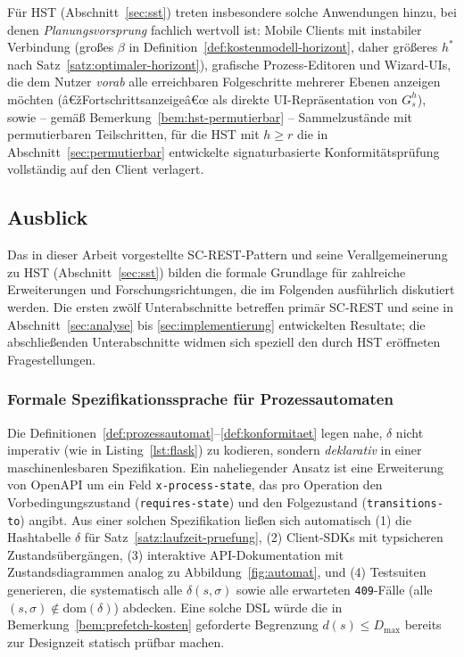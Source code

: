 ﻿\documentclass[a4paper,12pt]{article}
\theoremstyle{definition}
\begin{document}
Für HST (Abschnitt~\ref{sec:sst}) treten insbesondere solche Anwendungen hinzu, bei denen
\emph{Planungsvorsprung} fachlich wertvoll ist: Mobile Clients mit instabiler Verbindung
(großes $\beta$ in Definition~\ref{def:kostenmodell-horizont}, daher größeres $h^\ast$
nach Satz~\ref{satz:optimaler-horizont}), grafische Prozess-Editoren und Wizard-UIs, die
dem Nutzer \emph{vorab} alle erreichbaren Folgeschritte mehrerer Ebenen anzeigen möchten
(â€žFortschrittsanzeigeâ€œ als direkte UI-Repräsentation von $G_s^h$), sowie -- gemäß
Bemerkung~\ref{bem:hst-permutierbar} -- Sammelzustände mit permutierbaren Teilschritten,
für die HST mit $h\ge r$ die in Abschnitt~\ref{sec:permutierbar} entwickelte
signaturbasierte Konformitätsprüfung vollständig auf den Client verlagert.

\subsection{Ausblick}
\label{sec:ausblick}

Das in dieser Arbeit vorgestellte SC-REST-Pattern und seine Verallgemeinerung zu HST
(Abschnitt~\ref{sec:sst}) bilden die formale Grundlage für zahlreiche Erweiterungen und
Forschungsrichtungen, die im Folgenden ausführlich diskutiert werden. Die ersten zwölf
Unterabschnitte betreffen primär SC-REST und seine in Abschnitt~\ref{sec:analyse} bis
\ref{sec:implementierung} entwickelten Resultate; die abschließenden Unterabschnitte
widmen sich speziell den durch HST eröffneten Fragestellungen.

\subsubsection{Formale Spezifikationssprache für Prozessautomaten}

Die Definitionen~\ref{def:prozessautomat}--\ref{def:konformitaet} legen nahe, $\delta$
nicht imperativ (wie in Listing~\ref{lst:flask}) zu kodieren, sondern \emph{deklarativ} in
einer maschinenlesbaren Spezifikation. Ein naheliegender Ansatz ist eine Erweiterung von
OpenAPI um ein Feld \texttt{x-process-state}, das pro Operation den Vorbedingungszustand
(\texttt{requires-state}) und den Folgezustand (\texttt{transitions-to}) angibt. Aus einer
solchen Spezifikation ließen sich automatisch (1) die Hashtabelle $\delta$ für
Satz~\ref{satz:laufzeit-pruefung}, (2) Client-SDKs mit typsicheren Zustandsübergängen, (3)
interaktive API-Dokumentation mit Zustandsdiagrammen analog zu
Abbildung~\ref{fig:automat}, und (4) Testsuiten generieren, die systematisch alle
$\delta(s,\sigma)$ sowie alle erwarteten \texttt{409}-Fälle (alle $(s,\sigma)\notin
\mathrm{dom}(\delta)$) abdecken. Eine solche DSL würde die in
Bemerkung~\ref{bem:prefetch-kosten} geforderte Begrenzung $d(s)\leq D_{\max}$ bereits zur
Designzeit statisch prüfbar machen.
\end{document}

